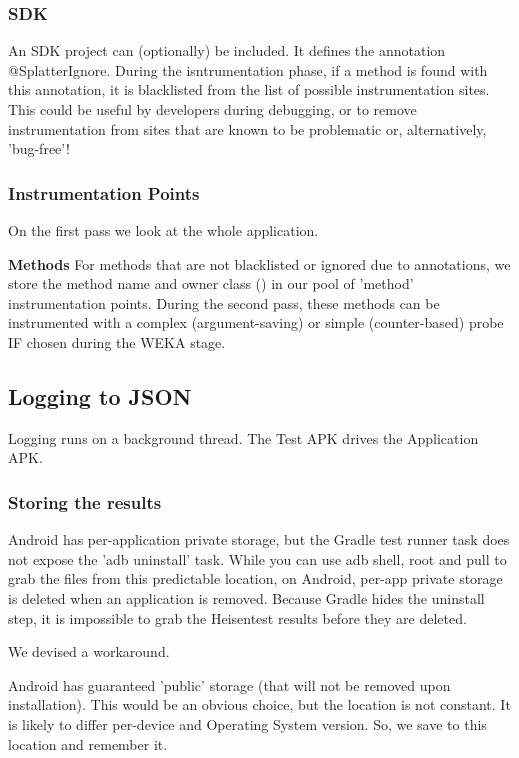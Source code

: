 \subsubsection{SDK}

An SDK project can (optionally) be included. It defines the annotation @SplatterIgnore. During the isntrumentation phase, if a method is found with this annotation, it is blacklisted from the list of possible instrumentation sites. This could be useful by developers during debugging, or to remove instrumentation from sites that are known to be problematic or, alternatively, 'bug-free'!

\subsubsection{Instrumentation Points}
On the first pass we look at the whole application.

\textbf{Methods}
For methods that are not blacklisted or ignored due to annotations, we store the method name and owner class () in our pool of 'method' instrumentation points. During the second pass, these methods can be instrumented with a complex (argument-saving) or simple (counter-based) probe IF chosen during the WEKA stage.

\subsection{Logging to JSON}

Logging runs on a background thread. The Test APK drives the Application APK.

\subsubsection{Storing the results}

Android has per-application private storage, but the Gradle test runner task does not expose the 'adb uninstall' task. While you can use adb shell, root and pull to grab the files from this predictable location, on Android, per-app private storage is deleted when an application is removed. Because Gradle hides the uninstall step, it is impossible to grab the Heisentest results before they are deleted.

We devised a workaround.

Android has guaranteed 'public' storage (that will not be removed upon installation). This would be an obvious choice, but the location is not constant. It is likely to differ per-device and Operating System version. So, we save to this location and remember it.

